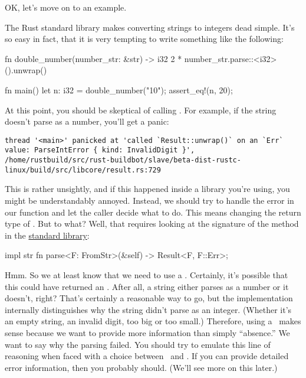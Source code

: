 \blank

OK, let's move on to an example.


The Rust standard library makes converting strings to integers dead simple. It's so easy in fact, that it is very tempting 
to write something like the following:

\begin{rustc}
fn double_number(number_str: &str) -> i32 {
    2 * number_str.parse::<i32>().unwrap()
}

fn main() {
    let n: i32 = double_number("10");
    assert_eq!(n, 20);
}
\end{rustc}

At this point, you should be skeptical of calling . For example, if the string doesn't parse as a number, 
you'll get a panic:

\begin{verbatim}
thread '<main>' panicked at 'called `Result::unwrap()` on an `Err` value: ParseIntError { kind: InvalidDigit }', /home/rustbuild/src/rust-buildbot/slave/beta-dist-rustc-linux/build/src/libcore/result.rs:729
\end{verbatim}

This is rather unsightly, and if this happened inside a library you're using, you might be understandably annoyed. Instead, 
we should try to handle the error in our function and let the caller decide what to do. This means changing the return type 
of . But to what? Well, that requires looking at the signature of the  method in the 
\href{https://doc.rust-lang.org/std/primitive.str.html\#method.parse}{standard library}:

\begin{rustc}
impl str {
    fn parse<F: FromStr>(&self) -> Result<F, F::Err>;
}
\end{rustc}

Hmm. So we at least know that we need to use a \result. Certainly, it's possible that this could have returned an 
\option. After all, a string either parses as a number or it doesn't, right? That's certainly a reasonable way to go, 
but the implementation internally distinguishes why the string didn't parse as an integer. (Whether it's an empty string, an 
invalid digit, too big or too small.) Therefore, using a \result\ makes sense because we want to provide more information 
than simply \enquote{absence.} We want to say why the parsing failed. You should try to emulate this line of reasoning when 
faced with a choice between \option\ and \result. If you can provide detailed error information, then you probably 
should. (We'll see more on this later.)

